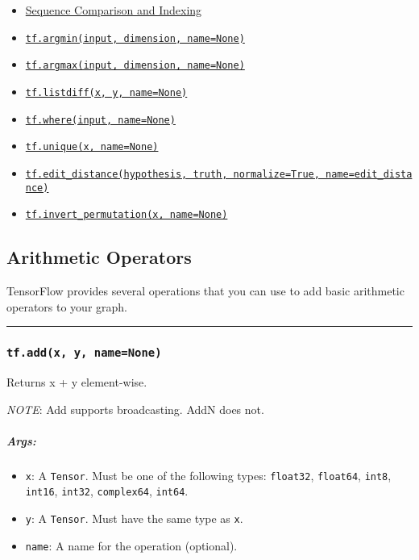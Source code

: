 \begin{itemize}
\item
  \protect\hyperlink{AUTOGENERATED-sequence-comparison-and-indexing}{Sequence
  Comparison and Indexing}
\item
  \protect\hyperlink{argmin}{\texttt{tf.argmin(input,\ dimension,\ name=None)}}
\item
  \protect\hyperlink{argmax}{\texttt{tf.argmax(input,\ dimension,\ name=None)}}
\item
  \protect\hyperlink{listdiff}{\texttt{tf.listdiff(x,\ y,\ name=None)}}
\item
  \protect\hyperlink{where}{\texttt{tf.where(input,\ name=None)}}
\item
  \protect\hyperlink{unique}{\texttt{tf.unique(x,\ name=None)}}
\item
  \protect\hyperlink{editux5fdistance}{\texttt{tf.edit\_distance(hypothesis,\ truth,\ normalize=True,\ name=\textquotesingle{}edit\_distance\textquotesingle{})}}
\item
  \protect\hyperlink{invertux5fpermutation}{\texttt{tf.invert\_permutation(x,\ name=None)}}
\end{itemize}

\subsection{Arithmetic Operators }\label{arithmetic-operators}

TensorFlow provides several operations that you can use to add basic
arithmetic operators to your graph.

\begin{center}\rule{0.5\linewidth}{\linethickness}\end{center}

\subsubsection{\texorpdfstring{\texttt{tf.add(x,\ y,\ name=None)}
}{tf.add(x, y, name=None) }}\label{tf.addx-y-namenone}

Returns x + y element-wise.

\emph{NOTE}: Add supports broadcasting. AddN does not.

\subparagraph{Args: }\label{args}

\begin{itemize}
\tightlist
\item
  \texttt{x}: A \texttt{Tensor}. Must be one of the following types:
  \texttt{float32}, \texttt{float64}, \texttt{int8}, \texttt{int16},
  \texttt{int32}, \texttt{complex64}, \texttt{int64}.
\item
  \texttt{y}: A \texttt{Tensor}. Must have the same type as \texttt{x}.
\item
  \texttt{name}: A name for the operation (optional).
\end{itemize}

